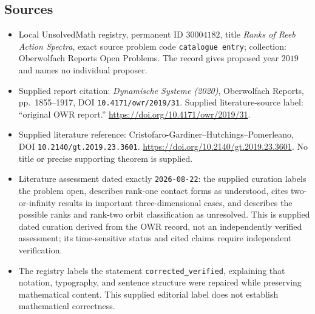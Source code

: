 \documentclass[11pt]{article}
\begin{document}
\subsection{Sources}
\begin{itemize}
\item Local UnsolvedMath registry, permanent ID \(30004182\), title \emph{Ranks of Reeb Action Spectra}, exact source problem code \texttt{catalogue entry}; collection: Oberwolfach Reports Open Problems. The record gives proposed year \(2019\) and names no individual proposer.
\item Supplied report citation: \emph{Dynamische Systeme (2020)}, Oberwolfach Reports, pp.\ 1855--1917, DOI \texttt{10.4171/owr/2019/31}. Supplied literature-source label: ``original OWR report.'' \url{https://doi.org/10.4171/owr/2019/31}.
\item Supplied literature reference: Cristofaro-Gardiner--Hutchings--Pomerleano, DOI \texttt{10.2140/gt.2019.23.3601}. \url{https://doi.org/10.2140/gt.2019.23.3601}. No title or precise supporting theorem is supplied.
\item Literature assessment dated exactly \texttt{2026-08-22}: the supplied curation labels the problem open, describes rank-one contact forms as understood, cites two-or-infinity results in important three-dimensional cases, and describes the possible ranks and rank-two orbit classification as unresolved. This is supplied dated curation derived from the OWR record, not an independently verified assessment; its time-sensitive status and cited claims require independent verification.
\item The registry labels the statement \texttt{corrected\_verified}, explaining that notation, typography, and sentence structure were repaired while preserving mathematical content. This supplied editorial label does not establish mathematical correctness.
\end{itemize}
\end{document}
